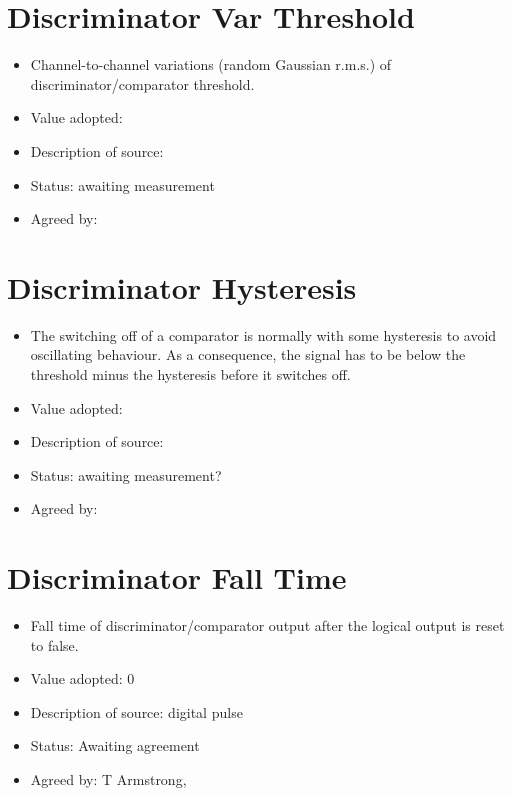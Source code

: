 \documentclass[GCT,short]{gct}
\begin{document}
\section{Discriminator Var Threshold}
\begin{itemize}
\item Channel-to-channel variations (random Gaussian r.m.s.) of discriminator/comparator threshold.
\item Value adopted: 
\item Description of source: 
\item Status: \color{red}awaiting measurement\color{black}
\item Agreed by: 
\end{itemize}


\section{Discriminator Hysteresis}
\begin{itemize}
\item The switching off of a comparator is normally with some hysteresis to avoid oscillating behaviour. As a consequence, the signal has to be below the threshold minus the hysteresis before it switches off.
\item Value adopted: 
\item Description of source: 
\item Status: \color{red}awaiting measurement?\color{black}
\item Agreed by: 
\end{itemize}


\section{Discriminator Fall Time}
\begin{itemize}
\item Fall time of discriminator/comparator output after the logical output is reset to false.
\item Value adopted: 0
\item Description of source: digital pulse
\item Status: \color{orange}Awaiting agreement\color{black}
\item Agreed by: T Armstrong, 
\end{itemize}
\end{document}
